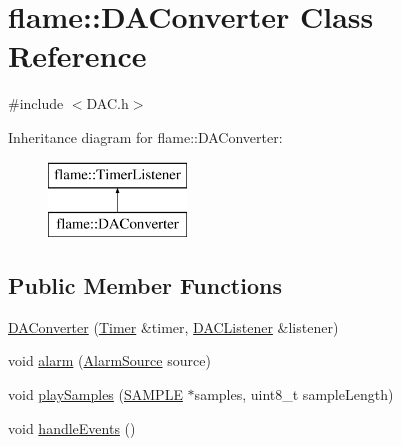\hypertarget{classflame_1_1_d_a_converter}{\section{flame\-:\-:D\-A\-Converter Class Reference}
\label{classflame_1_1_d_a_converter}
}


{\ttfamily \#include $<$D\-A\-C.\-h$>$}

Inheritance diagram for flame\-:\-:D\-A\-Converter\-:\begin{figure}[H]
\begin{center}
\leavevmode
\includegraphics[height=2.000000cm]{classflame_1_1_d_a_converter}
\end{center}
\end{figure}
\subsection*{Public Member Functions}
\begin{DoxyCompactItemize}
\item 
\hyperlink{classflame_1_1_d_a_converter_afe3e4f8e96154d3a9c117c0658309caf}{D\-A\-Converter} (\hyperlink{classflame_1_1_timer}{Timer} \&timer, \hyperlink{classflame_1_1_d_a_c_listener}{D\-A\-C\-Listener} \&listener)
\item 
void \hyperlink{classflame_1_1_d_a_converter_a35dba185dfbd8483069c7a3ee9c19e5c}{alarm} (\hyperlink{namespaceflame_a6d176ba245556716fd3e32006bb7cfe5}{Alarm\-Source} source)
\item 
void \hyperlink{classflame_1_1_d_a_converter_a6a1864d308d9e9cbf52ec5f8e6149be1}{play\-Samples} (\hyperlink{_d_a_c_8h_a5a6d1dc37ffa32957a63868cd1da39b3}{S\-A\-M\-P\-L\-E} $\ast$samples, uint8\-\_\-t sample\-Length)
\item 
void \hyperlink{classflame_1_1_d_a_converter_a3e91956332022f13cc6688217c4010ab}{handle\-Events} ()
\end{DoxyCompactItemize}

